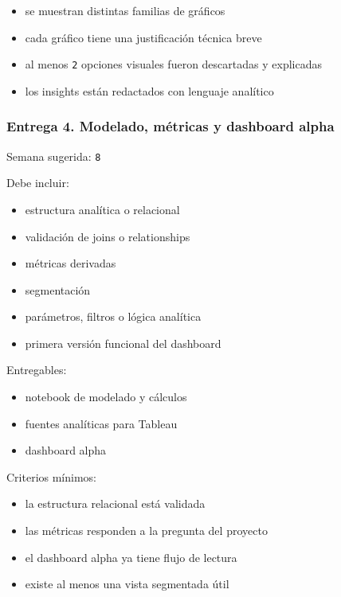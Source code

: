 \documentclass[
]{article}
\providecommand{\tightlist}{%
  \setlength{\itemsep}{0pt}\setlength{\parskip}{0pt}}
\begin{document}
\begin{itemize}
\tightlist
\item
  se muestran distintas familias de gráficos
\item
  cada gráfico tiene una justificación técnica breve
\item
  al menos \texttt{2} opciones visuales fueron descartadas y explicadas
\item
  los insights están redactados con lenguaje analítico
\end{itemize}

\subsubsection{Entrega 4. Modelado, métricas y dashboard
alpha}\label{entrega-4-modelado-muxe9tricas-y-dashboard-alpha}

Semana sugerida: \texttt{8}

Debe incluir:

\begin{itemize}
\tightlist
\item
  estructura analítica o relacional
\item
  validación de joins o relationships
\item
  métricas derivadas
\item
  segmentación
\item
  parámetros, filtros o lógica analítica
\item
  primera versión funcional del dashboard
\end{itemize}

Entregables:

\begin{itemize}
\tightlist
\item
  notebook de modelado y cálculos
\item
  fuentes analíticas para Tableau
\item
  dashboard alpha
\end{itemize}

Criterios mínimos:

\begin{itemize}
\tightlist
\item
  la estructura relacional está validada
\item
  las métricas responden a la pregunta del proyecto
\item
  el dashboard alpha ya tiene flujo de lectura
\item
  existe al menos una vista segmentada útil
\end{itemize}
\end{document}
